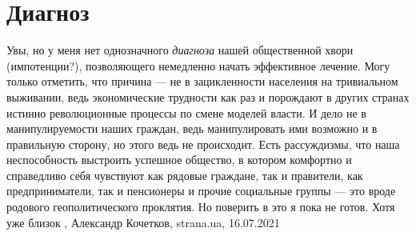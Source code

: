  
 
 
 
 
\chapter{Диагноз}
\label{sec:slova.diagnoz}

Увы, но у меня нет однозначного \emph{диагноза} нашей общественной хвори
(импотенции?), позволяющего немедленно начать эффективное лечение. Могу только
отметить, что причина — не в зацикленности населения на тривиальном выживании,
ведь экономические трудности как раз и порождают в других странах истинно
революционные процессы по смене моделей власти. И дело не в манипулируемости
наших граждан, ведь манипулировать ими возможно и в правильную сторону, но
этого ведь не происходит.  Есть рассуждизмы, что наша неспособность выстроить
успешное общество, в котором комфортно и справедливо себя чувствуют как рядовые
граждане, так и правители, как предприниматели, так и пенсионеры и прочие
социальные группы — это вроде родового геополитического проклятия. Но поверить
в это я пока не готов. Хотя уже близок
, 
Александр Кочетков, strana.ua, 16.07.2021

